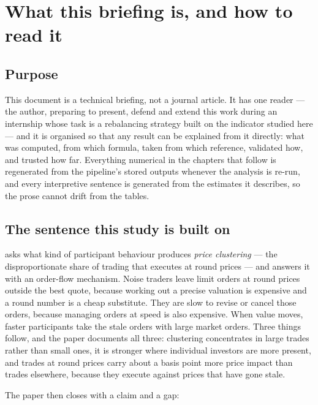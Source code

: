\section{What this briefing is, and how to read it}
\label{sec:intro}

\subsection{Purpose}

This document is a technical briefing, not a journal article. It has one
reader --- the author, preparing to present, defend and extend this work
during an internship whose task is a rebalancing strategy built on the
indicator studied here --- and it is organised so that any result can be
explained from it directly: what was computed, from which formula, taken from
which reference, validated how, and trusted how far. Everything numerical in
the chapters that follow is regenerated from the pipeline's stored outputs
whenever the analysis is re-run, and every interpretive sentence is generated
from the estimates it describes, so the prose cannot drift from the tables.

\subsection{The sentence this study is built on}

\textcite{Ohta2026NoiseTraders} asks what kind of participant behaviour produces
\emph{price clustering} --- the disproportionate share of trading that executes at
round prices --- and answers it with an order-flow mechanism. Noise traders leave
limit orders at round prices outside the best quote, because working out a
precise valuation is expensive and a round number is a cheap substitute. They are
slow to revise or cancel those orders, because managing orders at speed is also
expensive. When value moves, faster participants take the stale orders with large
market orders. Three things follow, and the paper documents all three: clustering
concentrates in large trades rather than small ones, it is stronger where
individual investors are more present, and trades at round prices carry about a
basis point more price impact than trades elsewhere, because they execute against
prices that have gone stale.

The paper then closes with a claim and a gap:

